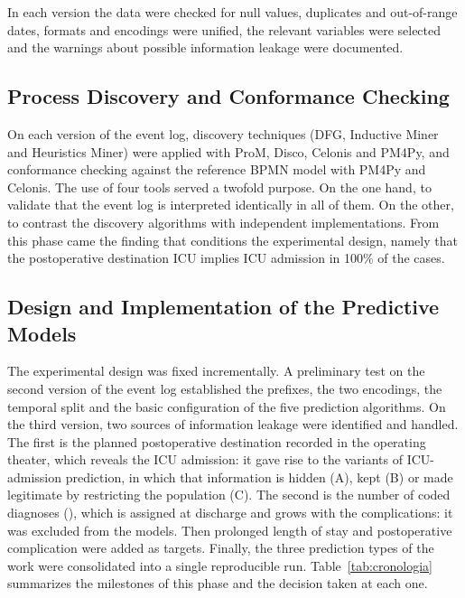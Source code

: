 In each version the data were checked for null values, duplicates and out-of-range dates, formats and encodings were unified, the relevant variables were selected and the warnings about possible information leakage were documented.

\subsection{Process Discovery and Conformance Checking}

On each version of the event log, discovery techniques (DFG, Inductive Miner and Heuristics Miner) were applied with ProM, Disco, Celonis and PM4Py, and conformance checking against the reference BPMN model with PM4Py and Celonis. The use of four tools served a twofold purpose. On the one hand, to validate that the event log is interpreted identically in all of them. On the other, to contrast the discovery algorithms with independent implementations. From this phase came the finding that conditions the experimental design, namely that the postoperative destination ICU implies ICU admission in 100\% of the cases.

\subsection{Design and Implementation of the Predictive Models}

The experimental design was fixed incrementally. A preliminary test on the second version of the event log established the prefixes, the two encodings, the temporal split and the basic configuration of the five prediction algorithms. On the third version, two sources of information leakage were identified and handled. The first is the planned postoperative destination recorded in the operating theater, which reveals the ICU admission: it gave rise to the variants of ICU-admission prediction, in which that information is hidden (A), kept (B) or made legitimate by restricting the population (C). The second is the number of coded diagnoses (), which is assigned at discharge and grows with the complications: it was excluded from the models. Then prolonged length of stay and postoperative complication were added as targets. Finally, the three prediction types of the work were consolidated into a single reproducible run. Table~\ref{tab:cronologia} summarizes the milestones of this phase and the decision taken at each one.

